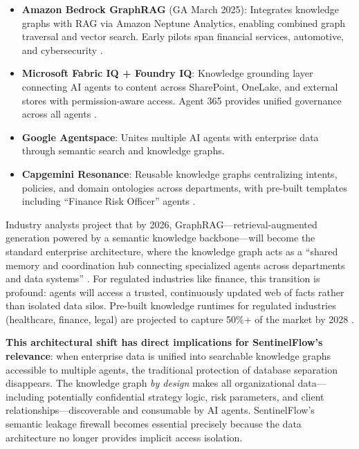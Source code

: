 \documentclass[12pt,a4paper]{article}
\begin{document}
\begin{itemize}[leftmargin=*]
    \item \textbf{Amazon Bedrock GraphRAG} (GA March 2025): Integrates knowledge graphs with RAG via Amazon Neptune Analytics, enabling combined graph traversal and vector search. Early pilots span financial services, automotive, and cybersecurity \cite{aws_graphrag_2025}.
    \item \textbf{Microsoft Fabric IQ + Foundry IQ}: Knowledge grounding layer connecting AI agents to content across SharePoint, OneLake, and external stores with permission-aware access. Agent 365 provides unified governance across all agents \cite{ms_financial_ai_2026}.
    \item \textbf{Google Agentspace}: Unites multiple AI agents with enterprise data through semantic search and knowledge graphs.
    \item \textbf{Capgemini Resonance}: Reusable knowledge graphs centralizing intents, policies, and domain ontologies across departments, with pre-built templates including ``Finance Risk Officer'' agents \cite{capgemini_resonance_2025}.
\end{itemize}

Industry analysts project that by 2026, GraphRAG---retrieval-augmented generation powered by a semantic knowledge backbone---will become the standard enterprise architecture, where the knowledge graph acts as a ``shared memory and coordination hub connecting specialized agents across departments and data systems'' \cite{graphwise_enterprise_ai_2026}. For regulated industries like finance, this transition is profound: agents will access a trusted, continuously updated web of facts rather than isolated data silos. Pre-built knowledge runtimes for regulated industries (healthcare, finance, legal) are projected to capture 50\%+ of the market by 2028 \cite{nstarx_rag_evolution_2026}.

\textbf{This architectural shift has direct implications for SentinelFlow's relevance}: when enterprise data is unified into searchable knowledge graphs accessible to multiple agents, the traditional protection of database separation disappears. The knowledge graph \textit{by design} makes all organizational data---including potentially confidential strategy logic, risk parameters, and client relationships---discoverable and consumable by AI agents. SentinelFlow's semantic leakage firewall becomes essential precisely because the data architecture no longer provides implicit access isolation.
\end{document}
